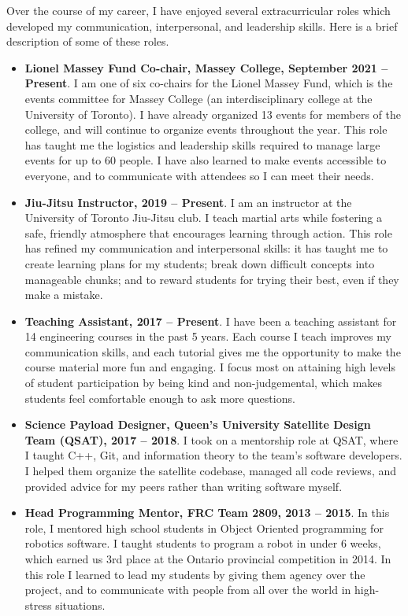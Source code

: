 \documentclass[a4paper,12pt]{article}
\begin{document}
Over the course of my career, I have enjoyed several extracurricular
roles which developed my communication, interpersonal, and leadership skills.
Here is a brief description of some of these roles.
\begin{itemize}
\item \textbf{Lionel Massey Fund Co-chair, Massey College, September 2021 -- Present}.
    I am one of six co-chairs for the Lionel Massey Fund, which is the events
    committee for Massey College (an interdisciplinary college at the University
    of Toronto).
    I have already organized 13 events for members of the college, and will
    continue to organize events throughout the year.
    This role has taught me the logistics and leadership skills required to
    manage large events for up to 60 people.
    I have also learned to make events accessible to everyone, and to
    communicate with attendees so I can meet their needs.

\item \textbf{Jiu-Jitsu Instructor, 2019 -- Present}. 
    I am an instructor at the University of Toronto Jiu-Jitsu club. I teach
    martial arts while fostering a safe, friendly atmosphere that
    encourages learning through action.
    This role has refined my communication and interpersonal skills:
    it has taught me to create learning plans for my students;
    break down difficult concepts into manageable chunks; 
    and to reward students for trying their best, even if they make a mistake.

\item \textbf{Teaching Assistant, 2017 -- Present}.
    I have been a teaching assistant for 14 engineering courses in the past 5 years.
    Each course I teach improves my communication skills, and each tutorial gives
    me the opportunity to make the course material more fun and engaging.
    I focus most on attaining high levels of student participation by being
    kind and non-judgemental, which makes students feel
    comfortable enough to ask more questions.

\item \textbf{Science Payload Designer, Queen’s University Satellite Design
    Team (QSAT), 2017 -- 2018}. 
    I took on a mentorship role at QSAT, where I taught C++, Git, and information
    theory to the team's software developers. I helped them organize
    the satellite codebase, managed all code reviews, and provided advice for my
    peers rather than writing software myself.

\item \textbf{Head Programming Mentor, FRC Team 2809, 2013 -- 2015}. 
    In this role, I mentored high school students in Object Oriented programming
    for robotics software. I taught students to program a robot in under 6
    weeks, which earned us 3rd place at the Ontario provincial competition in
    2014.
    In this role I learned to lead my students by giving them agency over the
    project, and to communicate with people from all over the world in
    high-stress situations.

\end{itemize}
\end{document}
